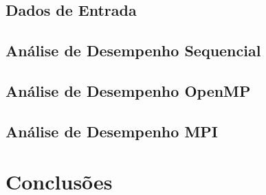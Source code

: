 \documentclass[a4paper]{IEEEtran}
\begin{document}
\subsection{Dados de Entrada}

\subsection{Análise de Desempenho Sequencial}

\subsection{Análise de Desempenho OpenMP}

\subsection{Análise de Desempenho MPI}

\section{Conclusões}
\end{document}
